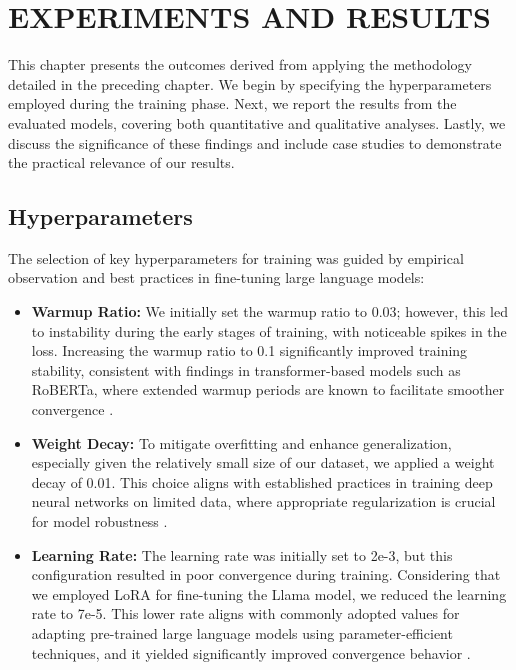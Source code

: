 \captionsetup[lstlisting]{font=small,labelfont=bf}



\chapter{ EXPERIMENTS AND RESULTS}

This chapter presents the outcomes derived from applying the methodology detailed in the preceding chapter. We begin by specifying the hyperparameters employed during the training phase. Next, we report the results from the evaluated models, covering both quantitative and qualitative analyses. Lastly, we discuss the significance of these findings and include case studies to demonstrate the practical relevance of our results.

\section{Hyperparameters}


The selection of key hyperparameters for training was guided by empirical observation and best practices in fine-tuning large language models:

\begin{itemize}
  \item \textbf{Warmup Ratio:} We initially set the warmup ratio to 0.03; however, this led to instability during the early stages of training, with noticeable spikes in the loss. Increasing the warmup ratio to 0.1 significantly improved training stability, consistent with findings in transformer-based models such as RoBERTa, where extended warmup periods are known to facilitate smoother convergence \citep{liu2019robertarobustlyoptimizedbert}.
  \item \textbf{Weight Decay:} To mitigate overfitting and enhance generalization, especially given the relatively small size of our dataset, we applied a weight decay of 0.01. This choice aligns with established practices in training deep neural networks on limited data, where appropriate regularization is crucial for model robustness \citep{brainacgan}.
  \item \textbf{Learning Rate:} The learning rate was initially set to 2e-3, but this configuration resulted in poor convergence during training. Considering that we employed LoRA for fine-tuning the Llama model, we reduced the learning rate to 7e-5. This lower rate aligns with commonly adopted values for adapting pre-trained large language models using parameter-efficient techniques, and it yielded significantly improved convergence behavior \citep{zhou2024automixqselfadjustingquantizationhigh}.
\end{itemize}

